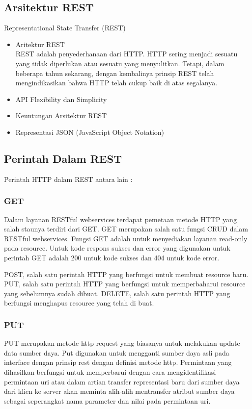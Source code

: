 \documentclass[12pt,a4paper]{article}
\begin{document}
\subsection{Arsitektur REST}
Representational State Transfer (REST)
\begin{itemize}
\item Aritektur REST \\
REST adalah penyederhanaan dari HTTP. HTTP sering menjadi sesuatu yang tidak diperlukan atau sesuatu yang menyulitkan. Tetapi, dalam beberapa tahun sekarang, dengan kembalinya prinsip REST telah mengindikasikan bahwa HTTP telah cukup baik di atas segalanya.
\item API Flexibility dan Simplicity 
\item Keuntungan Arsitektur REST 
\item Representasi JSON (JavaScript Object Notation) 
\end{itemize}
\subsection{Perintah Dalam REST}
Perintah HTTP dalam REST antara lain :
\subsubsection{GET}
Dalam layanan RESTful webservices terdapat pemetaan metode HTTP yang salah staunya terdiri dari GET. GET merupakan salah satu fungsi CRUD dalam RESTful webservices. Fungsi GET adalah untuk menyediakan layanan read-only pada resource. Untuk kode respons sukses dan error yang digunakan untuk perintah GET adalah 200 untuk kode sukses dan 404 untuk kode error. 

POST, salah satu perintah HTTP yang berfungsi untuk membuat resource baru.
PUT, salah satu perintah HTTP yang berfungsi untuk memperbaharui resource yang sebelumnya sudah dibuat.
DELETE, salah satu perintah HTTP yang berfungsi menghapus resource yang telah di buat.
\subsubsection{PUT}
PUT merupakan metode http request yang biasanya untuk melakukan update data sumber daya. Put digunakan untuk mengganti sumber daya asli pada interface dengan prinsip rest dengan definisi metode http. Permintaan yang dihasilkan berfungsi untuk memperbarui dengan cara  mengidentifikasi permintaan uri atau dalam artian transfer representasi baru dari sumber daya dari klien ke server akan meminta alih-alih mentransfer atribut sumber daya sebagai seperangkat nama parameter dan nilai pada permintaan uri.
\end{document}

